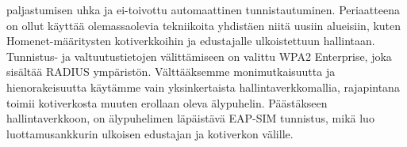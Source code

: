 \documentclass[12pt,a4paper,english]{tutthesis}
\begin{document}
\begin{otherlanguage}{finnish}
paljastumisen uhka ja ei-toivottu automaattinen tunnistautuminen.
Periaatteena on ollut käyttää olemassaolevia tekniikoita yhdistäen niitä uusiin alueisiin, kuten Homenet-määritysten kotiverkkoihin ja edustajalle ulkoistettuun hallintaan.
Tunnistus- ja valtuutustietojen välittämiseen on valittu WPA2 Enterprise, joka sisältää RADIUS ympäristön. Välttääksemme monimutkaisuutta ja hienorakeisuutta käytämme vain yksinkertaista hallintaverkkomallia, rajapintana toimii kotiverkosta muuten
erollaan oleva älypuhelin.
Päästäkseen hallintaverkkoon, on älypuhelimen läpäistävä EAP-SIM tunnistus, mikä luo luottamusankkurin ulkoisen edustajan ja kotiverkon välille.
\end{otherlanguage} %

\end{document}
